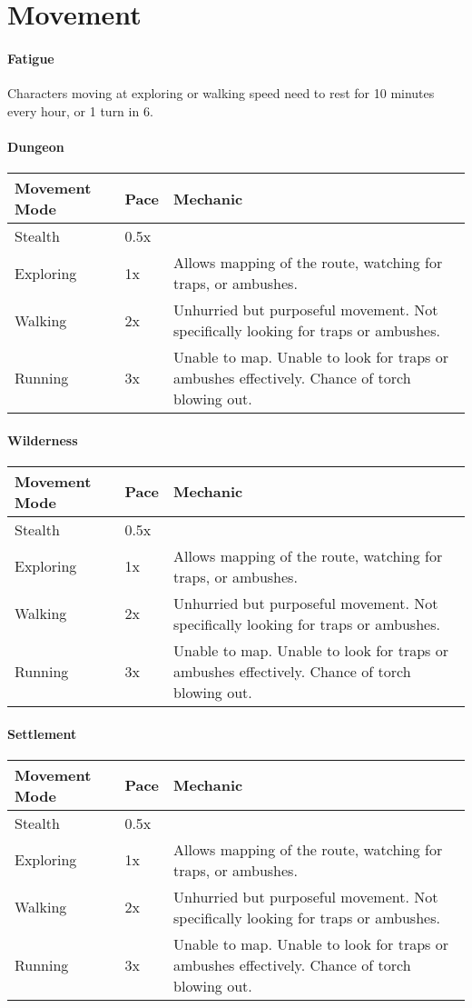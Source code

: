 \section{Movement}

\paragraph{Fatigue} Characters moving at exploring or walking speed need to rest for 10 minutes every hour, or 1 turn in 6.

\paragraph{Dungeon}
\begin{tabular}{l l p{8cm}}
    Movement Mode & Pace & Mechanic \\
    \hline
    Stealth & 0.5x & \\
    Exploring & 1x & Allows mapping of the route, watching for traps, or ambushes.\\
    Walking & 2x & Unhurried but purposeful movement. Not specifically looking for traps or ambushes.\\
    Running & 3x & Unable to map. Unable to look for traps or ambushes effectively. Chance of torch blowing out.\\
\end{tabular}

\paragraph{Wilderness}
\begin{tabular}{l l p{8cm}}
    Movement Mode & Pace & Mechanic \\
    \hline
    Stealth & 0.5x & \\
    Exploring & 1x & Allows mapping of the route, watching for traps, or ambushes.\\
    Walking & 2x & Unhurried but purposeful movement. Not specifically looking for traps or ambushes.\\
    Running & 3x & Unable to map. Unable to look for traps or ambushes effectively. Chance of torch blowing out.\\    
\end{tabular}
\paragraph{Settlement}
\begin{tabular}{l l p{8cm}}
    Movement Mode & Pace & Mechanic \\
    \hline
    Stealth & 0.5x & \\
    Exploring & 1x & Allows mapping of the route, watching for traps, or ambushes.\\
    Walking & 2x & Unhurried but purposeful movement. Not specifically looking for traps or ambushes.\\
    Running & 3x & Unable to map. Unable to look for traps or ambushes effectively. Chance of torch blowing out.\\   
\end{tabular}

